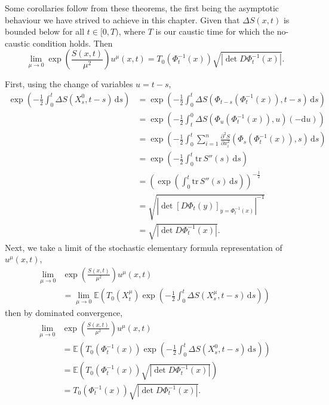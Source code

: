 \documentclass[a4paper,12pt,draft]{report}
\begin{document}
Some corollaries follow from these theorems, the first being the asymptotic behaviour we have strived to achieve in this chapter.
\corollary
{
Given that $\Delta S(x, t)$ is bounded below for all $t \in [0, T)$, where $T$ is our caustic time for which the no-caustic condition holds.  Then
$$
\lim_{\mu \to 0} \exp\left(\frac{S(x, t)}{\mu^2}\right)u^\mu(x, t) = T_0(\Phi_t^{-1}(x))\sqrt{|\det D\Phi_t^{-1}(x)|}.
$$
}
\proof
{
First, using the change of variables $u = t - s$,
\begin{align}
\exp\left(-\frac{1}{2}\int_0^t \Delta S(X^0_{s}, t - s)\,\mathrm{d}s\right) & = \exp\left(-\frac{1}{2}\int_0^t \Delta S(\Phi_{t - s}(\Phi_t^{-1}(x)), t - s)\,\mathrm{d}s\right)\nonumber\\
& = \exp\left(-\frac{1}{2}\int_t^0 \Delta S(\Phi_u(\Phi_t^{-1}(x)), u) (-\mathrm{d}u)\right)\nonumber\\
& = \exp\left(-\frac{1}{2}\int_0^t \sum_{i = 1}^n\frac{\partial^2 S}{\partial x_i^2}(\Phi_s(\Phi_t^{-1}(x)), s)\,\mathrm{d}s\right)\nonumber\\
& = \exp \left(-\frac{1}{2}\int_0^t \mathrm{tr}\,S''(s)\,\mathrm{d}s\right)\nonumber\\
& = \left(\exp \left(\int_0^t \mathrm{tr}\,S''(s)\,\mathrm{d}s\right)\right)^{-\frac{1}{2}}\nonumber\\
& = \sqrt{|\det \left[D\Phi_t(y)\right]_{y = \Phi_t^{-1}(x)}|^{-1}}\nonumber\\
& = \sqrt{|\det D\Phi_t^{-1}(x)|}.\nonumber
\end{align}
Next, we take a limit of the stochastic elementary formula representation of $u^\mu(x, t)$,
\begin{align}
\lim_{\mu \to 0} & \exp\left(\frac{S(x, t)}{\mu^2}\right)u^\mu(x, t)\nonumber\\
& = \lim_{\mu \to 0}\mathbb{E}\left(T_{0}(X^{\mu}_{t})\exp\left(-\frac{1}{2}\int_0^t \Delta S(X^{\mu}_{s}, t - s)\,\mathrm{d}s\right)\right)\nonumber
\end{align}
then by dominated convergence,
\begin{align}
\lim_{\mu \to 0} & \exp\left(\frac{S(x, t)}{\mu^2}\right)u^\mu(x, t)\nonumber\\
& = \mathbb{E}\left(T_{0}(\Phi_t^{-1}(x))\exp\left(-\frac{1}{2}\int_0^t \Delta S(X^0_{s}, t - s)\,\mathrm{d}s\right)\right)\nonumber\\
& = \mathbb{E}\left(T_{0}(\Phi_t^{-1}(x))\sqrt{|\det D\Phi_t^{-1}(x)|}\right)\nonumber\\
& = T_{0}(\Phi_t^{-1}(x))\sqrt{|\det D\Phi_t^{-1}(x)|}.\nonumber
\end{align}

\qedhere
}
\end{document}
